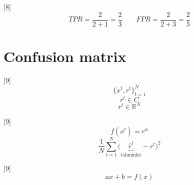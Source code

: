 \documentclass[11pt,a4paper]{article}
\begin{document}
[8]
\[ TPR = \frac{2}{2+1} = \frac{2}{3} \qquad FPR = \frac{2}{2+3} = \frac{2}{5} \]

\section{Confusion matrix}
[9]
\[ \{x^t, r^t\}_{t=1}^{N} \]
\[ r^t \in C \]
\[ r^t \in \mathbb{R}^N \]

[9]
\[ f(x^t) = r^{\alpha} \]
\[ \frac{1}{N}\sum_{t=1}^{N}\bigl(\underbrace{\hat r^t}_{\text{tahminler}} - r^t\bigr)^2 \]

[9]
\[ ax+b = f(x) \]
\end{document}
